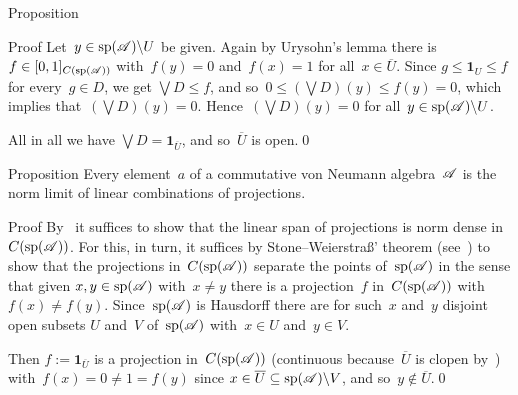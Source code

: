 \documentclass[a]{subfiles}
\begin{document}
\begin{parsec}
\begin{point}{Proposition}
\begin{point}{Proof}
Let~$y\in \mathrm{sp}(\mathscr{A})\backslash U$ be given.
Again by Urysohn's lemma
there is $f\in [0,1]_{C(\mathrm{sp}(\mathscr{A}))}$
with~$f(y)=0$ and~$f(x)=1$ for all~$x\in \overline{U}$.
Since $g\leq \mathbf{1}_U \leq f$
for every~$g\in D$,
we get $\bigvee D\leq f$,
and so~$0\leq (\bigvee D)(y)\leq f(y) =0$,
which implies that~$(\bigvee D)(y)=0$.
Hence~$(\bigvee D)(y)=0$ for all~$y\in \mathrm{sp}(\mathscr{A})\backslash U$.

All in all we have $\bigvee D = \mathbf{1}_{\overline{U}}$,
and so~$\overline{U}$ is open.\qed
\end{point}
\end{point}
\begin{point}{Proposition}%
Every element~$a$ of a commutative von Neumann algebra~$\mathscr{A}$
is the norm limit
of linear combinations of projections.
\begin{point}{Proof}%
By~
it suffices to show that the linear span
of projections is norm dense
in~$C(\mathrm{sp}(\mathscr{A}))$.
For this, in turn, it suffices 
by Stone--Weierstra\ss{}' theorem
(see~)
to show that the projections in~$C(\mathrm{sp}(\mathscr{A}))$
separate the points of~$\mathrm{sp}(\mathscr{A})$
in the sense
that given $x,y\in\mathrm{sp}(\mathscr{A})$
with~$x\neq y$
there is a projection~$f$ in~$C(\mathrm{sp}(\mathscr{A}))$
with~$f(x)\neq f(y)$.
Since~$\mathrm{sp}(\mathscr{A})$
is Hausdorff
there are for such~$x$ and~$y$
disjoint open subsets $U$ and~$V$
of~$\mathrm{sp}(\mathscr{A})$
with~$x\in U$ and~$y\in V$.

Then
$f:=\mathbf{1}_{\overline{U}}$
is a projection in~$C(\mathrm{sp}(\mathscr{A}))$
(continuous
because~$\overline{U}$
is clopen by~)
with~$f(x)=0\neq 1=f(y)$
since $x\in \overline{U}\subseteq \mathrm{sp}(\mathscr{A})\backslash V$,
and so~$y\notin \overline{U}$.\qed
\end{point}
\end{point}
\end{parsec}
\end{document}
